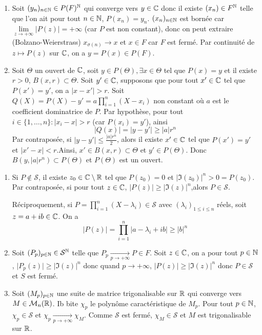 \begin{solution}
	\phantom{}
	\begin{enumerate}
		\item Soit $(y_{n})_{n\in\mathbb{N}}\in P(F)^{\mathbb{N}}$ qui converge vers $y\in\mathbb{C}$ donc il existe $(x_{n})\in F^{\mathbb{N}}$ telle que l'on ait pour tout $n\in\mathbb{N}$, $P(x_{n})=y_{n}$. $(x_{n})_{n\in\mathbb{N}}$ est bornée car $\lim\limits_{z\to+\infty}\vert P(z)\vert=+\infty$ (car $P$ est non constant), donc on peut extraire (Bolzano-Weierstrass) $x_{\sigma(n)}\to x$ et $x\in F$ car $F$ est fermé. Par continuité de $z\mapsto P(z)$ sur $\mathbb{C}$, on a $y=P(x)\in P(F)$.
		
		\item Soit $\Theta$ un ouvert de $\mathbb{C}$, soit $y\in P(\Theta),\exists x\in\Theta$ tel que $P(x)=y$ et il existe $r>0$, $B(x,r)\subset\Theta$. Soit $y'\in\mathbb{C}$, supposons que pour tout $x'\in\mathbb{C}$ tel que $P(x')=y'$, on a $\vert x-x'\vert>r$. Soit $Q(X)=P(X)-y'=a\prod_{i=1}^{n}(X-x_{i})$ non constant où $a$ est le coefficient dominatrice de $P$. Par hypothèse, pour tout $i\in\{1,\dots,n\}\colon\vert x_{i}-x\vert>r$ (car $P(x_{i})=y'$), ainsi 
		$$\vert Q(x)\vert=\vert y-y'\vert\geqslant\vert a\vert r^{n}$$
		Par contraposée, si $\vert y-y'\vert\leqslant\frac{\vert a\vert r^{n}}{2}$, alors il existe $x'\in\mathbb{C}$ tel que $P(x')=y'$ et $\vert x'-x\vert<r$.Ainsi, $x'\in B(x,r)\subset\Theta$ et $y'\in P(\Theta)$. Donc $B(y,\vert a\vert r^{n})\subset P(\Theta)$ et $P(\Theta)$ est un ouvert.
	\end{enumerate}
\end{solution}

\begin{solution}
	\phantom{}
	\begin{enumerate}
		\item Si $P\notin\mathcal{S}$, il existe $z_{0}\in\mathbb{C}\setminus\mathbb{R}$ tel que $P(z_{0})=0$ et $\vert\Im(z_{0})\vert^{n}>0=P(z_{0})$. Par contraposée, si pour tout $z\in\mathbb{C}$, $\vert P(z)\vert\geqslant\vert\Im(z_{})\vert^{n}$,alors $P\in\mathcal{S}$.

		Réciproquement, si $P=\prod_{i=1}^{n}(X-\lambda_{i})\in\mathcal{S}$ avec $(\lambda_{i})_{1\leqslant i\leqslant n}$ réels, soit $z=a+ib\in\mathbb{C}$. On a
		$$\vert P(z)\vert=\prod_{i=1}^{n}\vert a-\lambda_{i}+ib\vert\geqslant\vert b\vert^{n}$$
		
		\item Soit $(P_{p})_{p\in\mathbb{N}}\in\mathcal{S}^{\mathbb{N}}$ telle que $P_{p}\xrightarrow[p\to+\infty]{}P\in F$. Soit $z\in\mathbb{C}$, on a pour tout $p\in\mathbb{N}$, $\vert P_{p}(z)\vert\geqslant\vert\Im(z)\vert^{n}$ donc quand $p\to+\infty$, $\vert P(z)\vert\geqslant\vert\Im(z)\vert^{n}$ donc $P\in\mathcal{S}$ et $S$ est fermé.
		
		\item Soit $(M_{p})_{p\in\mathbb{N}}$ une suite de matrice trigonalisable sur $\mathbb{R}$ qui converge vers $M\in\mathcal{M}_{n}(\mathbb{R})$. Ib bite $\chi_{p}$ le polynôme caractéristique de $M_{p}$. Pour tout $p\in\mathbb{N}$, $\chi_{p}\in\mathcal{S}$ et $\chi_{p}\xrightarrow[p\to+\infty]{}\chi_{M}$. Comme $\mathcal{S}$ est fermé, $\chi_{M}\in \mathcal{S}$ et $M$ est trigonalisable sur $\mathbb{R}$.
	\end{enumerate}
\end{solution}

